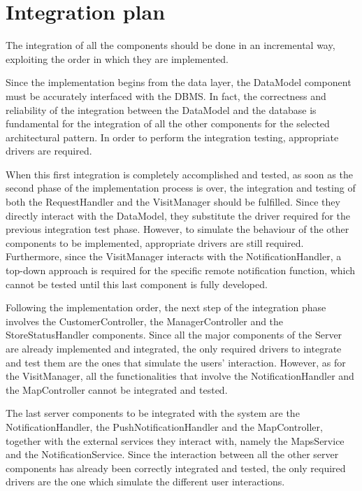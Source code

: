\documentclass[a4paper,oneside,11pt]{book}
\begin{document}
    \section{Integration plan}
    The integration of all the components should be done in an incremental way, exploiting the order in which they are implemented. \par
    Since the implementation begins from the data layer, the DataModel component must be accurately interfaced with the DBMS. In fact, the correctness and reliability of the integration between the DataModel and the database is fundamental for the integration of all the other components for the selected architectural pattern. In order to perform the integration testing, appropriate drivers are required. \par
    When this first integration is completely accomplished and tested, as soon as the second phase of the implementation process is over, the integration and testing of both the RequestHandler and the VisitManager should be fulfilled. Since they directly interact with the DataModel, they substitute the driver required for the previous integration test phase. However, to simulate the behaviour of the other components to be implemented, appropriate drivers are still required. Furthermore, since the VisitManager interacts with the NotificationHandler, a top-down approach is required for the specific remote notification function, which cannot be tested until this last component is fully developed. \par
    Following the implementation order, the next step of the integration phase involves the CustomerController, the ManagerController and the StoreStatusHandler components. Since all the major components of the Server are already implemented and integrated, the only required drivers to integrate and test them are the ones that simulate the users’ interaction. However, as for the VisitManager, all the functionalities that involve the NotificationHandler and the MapController cannot be integrated and tested. \par
    The last server components to be integrated with the system are the NotificationHandler, the PushNotificationHandler and the MapController, together with the external services they interact with, namely the MapsService and the NotificationService. Since the interaction between all the other server components has already been correctly integrated and tested, the only required drivers are the one which simulate the different user interactions. \par
\end{document}
